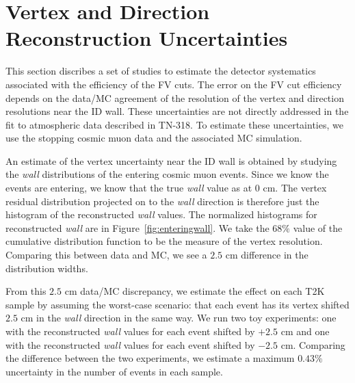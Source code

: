 \documentclass[12pt]{article}
\def\wall{\emph{wall}\xspace}
\begin{document}
\section{Vertex and Direction Reconstruction Uncertainties}
\label{sec:vtxunc}

This section discribes a set of studies to estimate the detector systematics
associated with the efficiency of the FV cuts.  The error on the FV cut
efficiency depends on the data/MC agreement of the resolution of the vertex and
direction resolutions near the ID wall.  These uncertainties are not directly
addressed in the fit to atmospheric data described in TN-318.  To estimate
these uncertainties, we use the stopping cosmic muon data and the associated MC
simulation.  

An estimate of the vertex uncertainty near the ID wall is obtained by studying the
\wall distributions of the entering cosmic muon events.  Since we know the
events are entering, we know that the true \wall value as at $0$ cm.  The
vertex residual distribution projected on to the \wall direction is therefore just the
histogram of the reconstructed \wall values.  The normalized histograms for
reconstructed \wall are in Figure~\ref{fig:enteringwall}.  We
take the $68\%$ value of the cumulative distribution function
to be the measure of the vertex resolution.  Comparing this between data
and MC, we see a $2.5$ cm difference in the distribution widths.  

From this $2.5$ cm data/MC discrepancy, we estimate the effect on each T2K
sample by assuming the worst-case scenario: that each event has its vertex shifted
$2.5$ cm in the \wall direction in the same way.  We run two toy experiments: one with
the reconstructed \wall values for each event shifted by $+2.5$ cm and one 
with the reconstructed \wall values for each event shifted by $-2.5$
cm.  Comparing the difference between the two experiments, we estimate a
maximum $0.43\%$ uncertainty in the number of events in each sample. 
\end{document}
